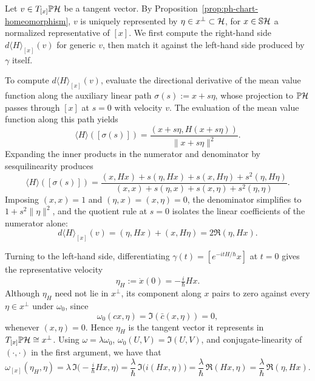 \vspace{0.5cm}

\noindent Let $v\in T_{[x]}\PH$ be a tangent vector. By Proposition~\ref{prop:ph-chart-homeomorphism}, $v$ is uniquely represented by $\eta\in x^\perp\subset\H$, for $x\in\mathbb S\H$ a normalized representative of $[x]$. We first compute the right-hand side $d\langle H\rangle_{[x]}(v)$ for generic $v$, then match it against the left-hand side produced by $\gamma$ itself.

\noindent To compute $d\langle H\rangle_{[x]}(v)$, evaluate the directional derivative of the mean value function along the auxiliary linear path $\sigma(s):=x+s\eta$, whose projection to $\PH$ passes through $[x]$ at $s=0$ with velocity $v$. The evaluation of the mean value function along this path yields
\[
\langle H\rangle([\sigma(s)]) = \frac{(x + s\eta, H(x + s\eta))}{\|x + s\eta\|^2}.
\]
Expanding the inner products in the numerator and denominator by sesquilinearity produces
\[
\langle H\rangle([\sigma(s)]) = \frac{(x, Hx) + s(\eta, Hx) + s(x, H\eta) + s^2(\eta, H\eta)}{(x, x) + s(\eta, x) + s(x, \eta) + s^2(\eta, \eta)}.
\]
Imposing $(x,x)=1$ and $(\eta,x)=(x,\eta)=0$, the denominator simplifies to $1+s^2\|\eta\|^2$, and the quotient rule at $s=0$ isolates the linear coefficients of the numerator alone:
\[
d\langle H\rangle_{[x]}(v) = (\eta, Hx) + (x, H\eta) = 2\Re(\eta, Hx).
\]

\noindent Turning to the left-hand side, differentiating $\gamma(t)=[e^{-itH/\hbar}x]$ at $t=0$ gives the representative velocity
\[
\eta_H:=\dot x(0)=-\tfrac i\hbar Hx.
\]
Although $\eta_H$ need not lie in $x^\perp$, its component along $x$ pairs to zero against every $\eta\in x^\perp$ under $\omega_0$, since $$\omega_0(cx,\eta)=\Im(\bar c(x,\eta))=0,$$ whenever $(x,\eta)=0$. Hence $\eta_H$ is the tangent vector it represents in $T_{[x]}\PH\cong x^\perp$. Using $\omega=\lambda\omega_0$, $\omega_0(U,V)=\Im(U,V)$, and conjugate-linearity of $(\cdot,\cdot)$ in the first argument, we have that
\[
\omega_{[x]}(\eta_H,\eta)=\lambda\,\Im\big(-\tfrac i\hbar Hx,\eta\big)=\frac\lambda\hbar\,\Im\big(i(Hx,\eta)\big)=\frac\lambda\hbar\,\Re(Hx,\eta)=\frac\lambda\hbar\,\Re(\eta,Hx).
\]

